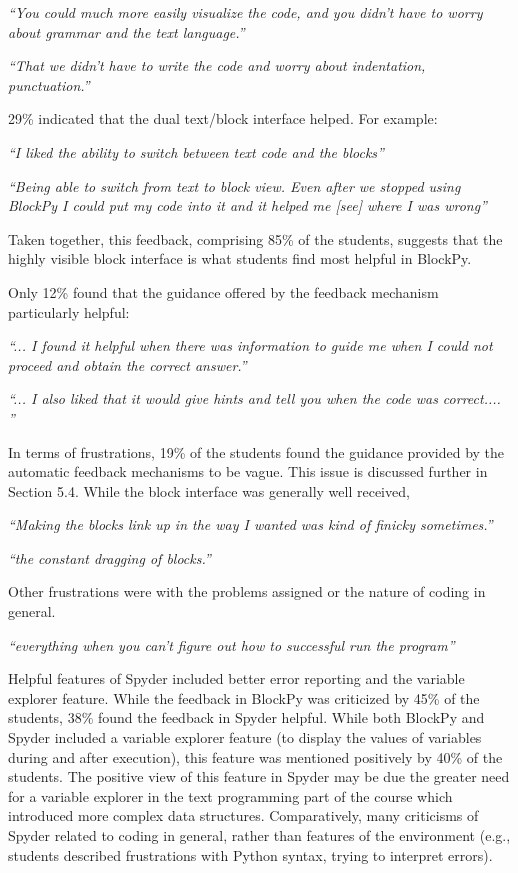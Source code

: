\documentclass[10pt,journal,compsoc]{IEEEtran}
\begin{document}
\textit{``You could much more easily visualize the code, and you didn't have to worry about grammar and the text language.''}

\textit{``That we didn't have to write the code and worry about indentation, punctuation.''}

29\% indicated that the dual text/block interface helped. For example:

\textit{``I liked the ability to switch between text code and the blocks''}

\textit{``Being able to switch from text to block view. Even after we stopped using BlockPy I could put my code into it and it helped me [see] where I was wrong''}

Taken together, this feedback, comprising 85\% of the students, suggests that the highly visible block interface is what students find most helpful in BlockPy.

Only 12\% found that the guidance offered by the feedback mechanism particularly helpful:

\textit{``... I found it helpful when there was information to guide me when I could not proceed and obtain the correct answer.''}

\textit{``... I also liked that it would give hints and tell you when the code was correct.... ''}

In terms of frustrations, 19\% of the students found the guidance provided by the automatic feedback mechanisms to be vague. This issue is discussed further in Section 5.4. While the block interface was generally well received, 


\textit{``Making the blocks link up in the way I wanted was kind of finicky sometimes.''}

\textit{``the constant dragging of blocks.''}


Other frustrations were with the problems assigned or the nature of coding in general.

\textit{``everything when you can't figure out how to successful run the program''}


Helpful features of Spyder included better error reporting and the variable explorer feature. While the feedback in BlockPy was criticized by 45\% of the students, 38\% found the feedback in Spyder helpful. While both BlockPy and Spyder included a variable explorer feature (to display the values of variables during and after execution), this feature was mentioned positively by 40\% of the students. The positive view of this feature in Spyder may be due the greater need for a variable explorer in the text programming part of the course which introduced more complex data structures.
Comparatively, many criticisms of Spyder related to coding in general, rather than features of the environment (e.g., students described frustrations with Python syntax, trying to interpret errors).
\end{document}
